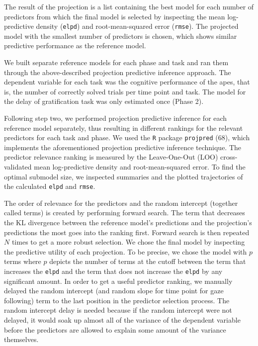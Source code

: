 \documentclass[
  man,floatsintext]{apa6}
\begin{document}
The result of the projection is a list containing the best model for each number of predictors from which the final model is selected by inspecting the mean log-predictive density (\texttt{elpd}) and root-mean-squared error (\texttt{rmse}). The projected model with the smallest number of predictors is chosen, which shows similar predictive performance as the reference model.

We built separate reference models for each phase and task and ran them through the above-described projection predictive inference approach. The dependent variable for each task was the cognitive performance of the apes, that is, the number of correctly solved trials per time point and task. The model for the delay of gratification task was only estimated once (Phase 2).

Following step two, we performed projection predictive inference for each reference model separately, thus resulting in different rankings for the relevant predictors for each task and phase. We used the \texttt{R} package \texttt{projpred} (68), which implements the aforementioned projection predictive inference technique. The predictor relevance ranking is measured by the Leave-One-Out (LOO) cross-validated mean log-predictive density and root-mean-squared error. To find the optimal submodel size, we inspected summaries and the plotted trajectories of the calculated \texttt{elpd} and \texttt{rmse}.

The order of relevance for the predictors and the random intercept (together called terms) is created by performing forward search. The term that decreases the KL divergence between the reference model's predictions and the projection's predictions the most goes into the ranking first. Forward search is then repeated \(N\) times to get a more robust selection. We chose the final model by inspecting the predictive utility of each projection. To be precise, we chose the model with \(p\) terms where \(p\) depicts the number of terms at the cutoff between the term that increases the \texttt{elpd} and the term that does not increase the \texttt{elpd} by any significant amount. In order to get a useful predictor ranking, we manually delayed the random intercept (and random slope for time point for gaze following) term to the last position in the predictor selection process. The random intercept delay is needed because if the random intercept were not delayed, it would soak up almost all of the variance of the dependent variable before the predictors are allowed to explain some amount of the variance themselves.
\end{document}
